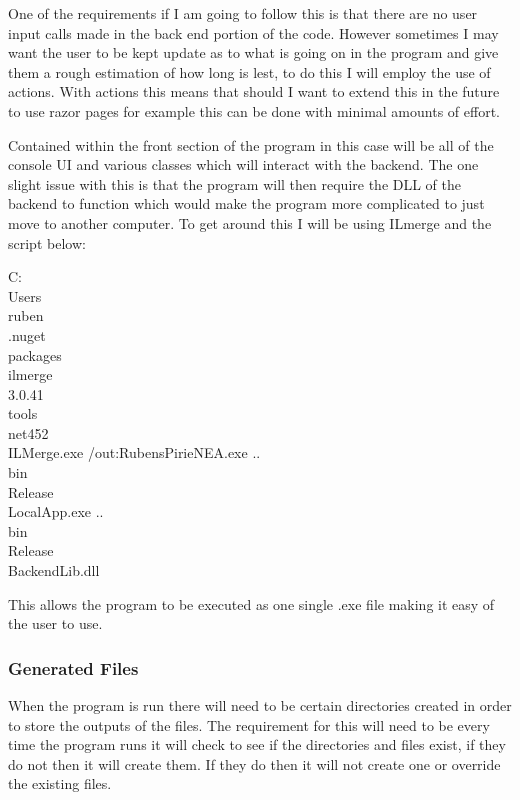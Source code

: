 \begin{FlushLeft}
    One of the requirements if I am going to follow this is that there are no user input calls made in the back end portion of the code. However sometimes I may want the user to be kept update as to what is going on in the program and give them a rough estimation of how long is lest, to do this I will employ the use of actions. With actions this means that should I want to extend this in the future to use razor pages for example this can be done with minimal amounts of effort. \\ \bk

    Contained within the front section of the program in this case will be all of the console UI and various classes which will interact with the backend. The one slight issue with this is that the program will then require the DLL of the backend to function which would make the program more complicated to just move to another computer. To get around this I will be using ILmerge and the script below:

    \begin{pseudocode}
C:\\Users\\ruben\\.nuget\\packages\\ilmerge\\3.0.41\\tools\\net452\\ILMerge.exe 
    /out:RubensPirieNEA.exe 
    ..\\bin\\Release\\LocalApp.exe 
    ..\\bin\\Release\\BackendLib.dll
    \end{pseudocode}

    This allows the program to be executed as one single .exe file making it easy of the user to use.\\ 

    \bk

    \subsubsection{Generated Files}
    When the program is run there will need to be certain directories created in order to store the outputs of the files. The requirement for this will need to be every time the program runs it will check to see if the directories and files exist, if they do not then it will create them. If they do then it will not create one or override the existing files. \\ \bk


\end{FlushLeft}
